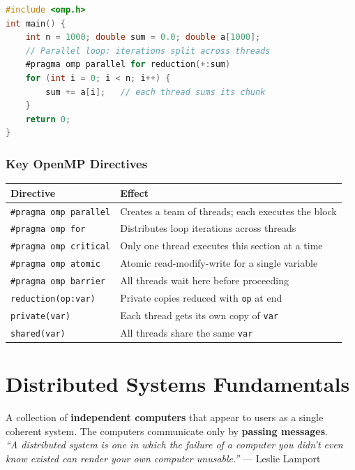 \documentclass[11pt,a4paper]{article}
\begin{document}
\begin{examplebox}
\begin{lstlisting}[language=C]
#include <omp.h>
int main() {
    int n = 1000; double sum = 0.0; double a[1000];
    // Parallel loop: iterations split across threads
    #pragma omp parallel for reduction(+:sum)
    for (int i = 0; i < n; i++) {
        sum += a[i];   // each thread sums its chunk
    }
    return 0;
}
\end{lstlisting}
\end{examplebox}

\subsubsection{Key OpenMP Directives}
\begin{longtable}{@{}p{4.5cm}p{9cm}@{}}
\toprule
\rowcolor{primary!15}
\textbf{Directive} & \textbf{Effect} \\
\midrule
\endhead
\texttt{\#pragma omp parallel} & Creates a team of threads; each executes the block \\
\texttt{\#pragma omp for} & Distributes loop iterations across threads \\
\texttt{\#pragma omp critical} & Only one thread executes this section at a time \\
\texttt{\#pragma omp atomic} & Atomic read-modify-write for a single variable \\
\texttt{\#pragma omp barrier} & All threads wait here before proceeding \\
\texttt{reduction(op:var)} & Private copies reduced with \texttt{op} at end \\
\texttt{private(var)} & Each thread gets its own copy of \texttt{var} \\
\texttt{shared(var)} & All threads share the same \texttt{var} \\
\bottomrule
\end{longtable}

\section{Distributed Systems Fundamentals}

\begin{definitionbox}
A collection of \textbf{independent computers} that appear to users as a single coherent system. The computers communicate only by \textbf{passing messages}.\\[4pt]
\textit{``A distributed system is one in which the failure of a computer you didn't even know existed can render your own computer unusable.''} --- Leslie Lamport
\end{definitionbox}
\end{document}
